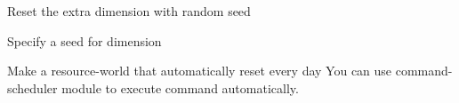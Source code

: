 \begin{example}{Reset the extra dimension with random seed}
\end{example}

\begin{tips}{Specify a seed for dimension}
    \\
\end{tips}

\begin{tips}{Make a resource-world that automatically reset every day}
    You can use command-scheduler module to execute  command automatically.
\end{tips}